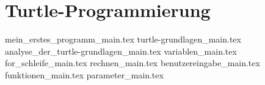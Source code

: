 

\part{Turtle-Programmierung}
\label{part:turtle-programmierung}

{mein_erstes_programm_main.tex}
{turtle-grundlagen_main.tex}
{analyse_der_turtle-grundlagen_main.tex}
{variablen_main.tex}
{for_schleife_main.tex}
{rechnen_main.tex}
{benutzereingabe_main.tex}
{funktionen_main.tex}
{parameter_main.tex}

